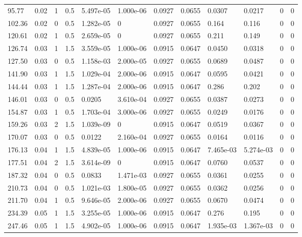 \documentclass[preview]{standalone}
\begin{document}
{{\begin{tabular}{L{1.2cm}C{1.2cm} C{0.3cm}C{0.5cm} C{1.4cm}C{1.4cm} C{1.4cm}C{1.4cm} C{1.6cm}C{1.6cm} C{1.6cm}C{1.6cm}}
  95.77  &  0.02  & 1     & 0.5 &  5.497e-05  & 1.000e-06  &  0.0927&   0.0655& 0.0307 & 0.0217   &  0 & 0  \\ 
  102.36  &  0.02  & 0     & 0.5 &  1.282e-05  & 0  &  0.0927&   0.0655& 0.164 & 0.116   &  0 & 0  \\ 
  120.61  &  0.02  & 1     & 0.5 &  2.659e-05  & 0  &  0.0927&   0.0655& 0.211 & 0.149   &  0 & 0  \\ 
  126.74  &  0.03  & 1     & 1.5 &  3.559e-05  & 1.000e-06  &  0.0915&   0.0647& 0.0450 & 0.0318   &  0 & 0  \\ 
  127.50  &  0.03  & 0     & 0.5 &  1.158e-03  & 2.000e-05  &  0.0927&   0.0655& 0.0689 & 0.0487   &  0 & 0  \\ 
  141.90  &  0.03  & 1     & 1.5 &  1.029e-04  & 2.000e-06  &  0.0915&   0.0647& 0.0595 & 0.0421   &  0 & 0  \\ 
  144.44  &  0.03  & 1     & 1.5 &  1.287e-04  & 2.000e-06  &  0.0915&   0.0647& 0.286 & 0.202   &  0 & 0  \\ 
  146.01  &  0.03  & 0     & 0.5 &  0.0205  & 3.610e-04  &  0.0927&   0.0655& 0.0387 & 0.0273   &  0 & 0  \\ 
  154.87  &  0.03  & 1     & 0.5 &  1.703e-04  & 3.000e-06  &  0.0927&   0.0655& 0.0249 & 0.0176   &  0 & 0  \\ 
  159.26  &  0.03  & 2     & 1.5 &  1.039e-09  & 0  &  0.0915&   0.0647& 0.0519 & 0.0367   &  0 & 0  \\ 
  170.07  &  0.03  & 0     & 0.5 &  0.0122  & 2.160e-04  &  0.0927&   0.0655& 0.0164 & 0.0116   &  0 & 0  \\ 
  176.13  &  0.04  & 1     & 1.5 &  4.839e-05  & 1.000e-06  &  0.0915&   0.0647& 7.465e-03 & 5.274e-03   &  0 & 0  \\ 
  177.51  &  0.04  & 2     & 1.5 &  3.614e-09  & 0  &  0.0915&   0.0647& 0.0760 & 0.0537   &  0 & 0  \\ 
  187.32  &  0.04  & 0     & 0.5 &  0.0833  & 1.471e-03  &  0.0927&   0.0655& 0.0361 & 0.0255   &  0 & 0  \\ 
  210.73  &  0.04  & 0     & 0.5 &  1.021e-03  & 1.800e-05  &  0.0927&   0.0655& 0.0362 & 0.0256   &  0 & 0  \\ 
  211.70  &  0.04  & 1     & 0.5 &  9.646e-05  & 2.000e-06  &  0.0927&   0.0655& 0.0670 & 0.0474   &  0 & 0  \\ 
  234.39  &  0.05  & 1     & 1.5 &  3.255e-05  & 1.000e-06  &  0.0915&   0.0647& 0.276 & 0.195   &  0 & 0  \\ 
  247.46  &  0.05  & 1     & 1.5 &  4.902e-05  & 1.000e-06  &  0.0915&   0.0647& 1.935e-03 & 1.367e-03   &  0 & 0  \\ 

\end{tabular}}}
\end{document}
